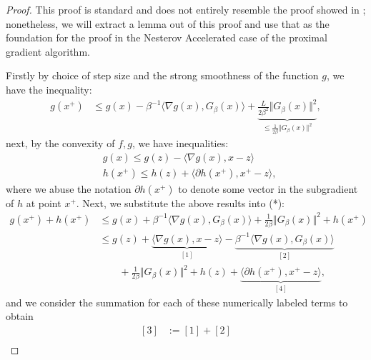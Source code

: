 \documentclass[]{article}
\theoremstyle{definition}
\begin{document}
        \begin{proof}
            This proof is standard and does not entirely resemble the proof showed in \cite[Aimir, Teboulle]{paper:FISTA}; nonetheless, we will extract a lemma out of this proof and use that as the foundation for the proof in the Nesterov Accelerated case of the proximal gradient algorithm.  
            \par
            Firstly by choice of step size and the strong smoothness of the function $g$, we have the inequality: 
            \begin{align*}
                g(x^+) 
                & \le 
                g(x) - \beta^{-1}\langle \nabla g(x), G_\beta(x)\rangle + \underbrace{\frac{L}{2\beta^2}\Vert G_\beta(x)\Vert^2}_
                {
                    \le \frac{1}{2\beta}\Vert G_\beta(x)\Vert^2
                }, \tag{*}
            \end{align*}
            next, by the convexity of $f, g$, we have inequalities: 
            \begin{align*}
                & g(x) \le g(z) - \langle \nabla g(x), x - z\rangle
                \\
                & h(x^+)\le h(z) + \langle \partial h(x^+), x^+ - z\rangle, 
            \end{align*}
            where we abuse the notation $\partial h(x^+)$ to denote some vector in the subgradient of $h$ at point $x^+$. Next, we substitute the above results into (*): 
            \begin{align*}
                g(x^+) + h(x^+) 
                & \le 
                g(x) + \beta^{-1}\langle \nabla g(x), G_\beta(x)\rangle + \frac{1}{2\beta}\Vert G_\beta(x)\Vert^2 + h(x^+) 
                \\
                & \le 
                g(z) + 
                \underbrace{\langle \nabla g(x), x - z\rangle }_{[1]}
                - 
                \underbrace{\beta^{-1}\langle \nabla g(x), G_\beta(x)\rangle}_{[2]}
                \\& \quad \quad 
                + 
                \frac{1}{2\beta}\Vert G_\beta(x)\Vert^2 + h(z) + 
                \underbrace{\langle \partial h(x^+), x^+ - z\rangle}_{[4]}, 
                \tag{$\nabla$}
            \end{align*}
            and we consider the summation for each of these numerically labeled terms to obtain
            \begin{align*}
                {[3]}& := [1] + [2]
                \\

\end{align*}
\end{proof}
\end{document}
